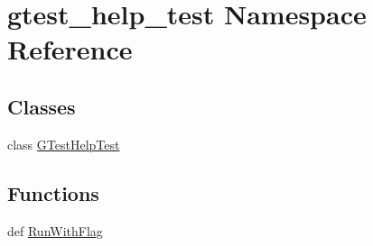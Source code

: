 \hypertarget{namespacegtest__help__test}{\section{gtest\-\_\-help\-\_\-test \-Namespace \-Reference}
\label{de/dbf/namespacegtest__help__test}
}
\subsection*{\-Classes}
\begin{DoxyCompactItemize}
\item 
class \hyperlink{classgtest__help__test_1_1GTestHelpTest}{\-G\-Test\-Help\-Test}
\end{DoxyCompactItemize}
\subsection*{\-Functions}
\begin{DoxyCompactItemize}
\item 
def \hyperlink{namespacegtest__help__test_af3afba8549b2e3bb77e59a98995c3f75}{\-Run\-With\-Flag}
\end{DoxyCompactItemize}
